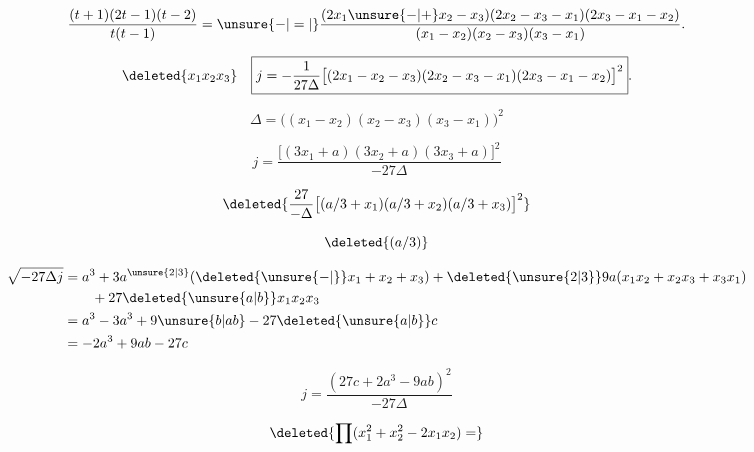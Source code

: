 \[
\frac{(t+1)(2t-1)(t-2)}{t(t-1)}
=\unsure{-|=|}\frac{(2x_1\unsure{-|+}x_2-x_3)(2x_2-x_3-x_1)(2x_3-x_1-x_2)}
{(x_1-x_2)(x_2-x_3)(x_3-x_1)}.
\]

\[
\deleted{x_1x_2x_3}\quad
\boxed{j=-\frac{1}{27\Delta}\bigl[(2x_1-x_2-x_3)(2x_2-x_3-x_1)(2x_3-x_1-x_2)\bigr]^2}.
\]

\[
\Delta=\bigl((x_1-x_2)(x_2-x_3)(x_3-x_1)\bigr)^2
\]

\[
j=\frac{\bigl[(3x_1+a)(3x_2+a)(3x_3+a)\bigr]^2}{-27\Delta}
\]

\[
\deleted{\frac{27}{-\Delta}\bigl[(a/3+x_1)(a/3+x_2)(a/3+x_3)\bigr]^2}
\]

\[
\deleted{(a/3)}
\]

\[
\begin{aligned}
\sqrt{-27\Delta j}&=a^3+3a^{\unsure{2|3}}(\deleted{\unsure{-|}}x_1+x_2+x_3)+\deleted{\unsure{2|3}}9a(x_1x_2+x_2x_3+x_3x_1)\\
&\qquad+27\deleted{\unsure{a|b}}x_1x_2x_3\\
&=a^3-3a^3+9\unsure{b|ab}-27\deleted{\unsure{a|b}}c\\
&=-2a^3+9ab-27c
\end{aligned}
\]

\[
\boxed{j=\frac{(27c+2a^3-9ab)^2}{-27\Delta}}
\]

\[
\deleted{\prod(x_1^2+x_2^2-2x_1x_2)=}
\]

